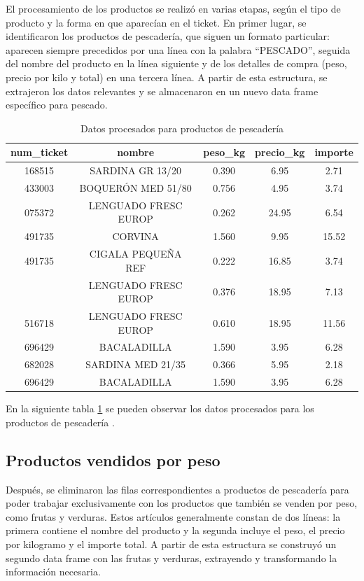 \documentclass[,article,submit,moreauthors,pdftex]{Definitions/mdpi}
\begin{document}
El procesamiento de los productos se realizó en varias etapas, según el
tipo de producto y la forma en que aparecían en el ticket. En primer
lugar, se identificaron los productos de pescadería, que siguen un
formato particular: aparecen siempre precedidos por una línea con la
palabra ``PESCADO'', seguida del nombre del producto en la línea
siguiente y de los detalles de compra (peso, precio por kilo y total) en
una tercera línea. A partir de esta estructura, se extrajeron los datos
relevantes y se almacenaron en un nuevo data frame específico para
pescado.

\begin{table}

\caption{\label{tab:tabla_pescado}Datos procesados para productos de pescadería}
\centering
\begin{tabular}[t]{ccccc}
\toprule
num\_ticket & nombre & peso\_kg & precio\_kg & importe\\
\midrule
168515 & SARDINA GR 13/20 & 0.390 & 6.95 & 2.71\\
433003 & BOQUERÓN MED 51/80 & 0.756 & 4.95 & 3.74\\
075372 & LENGUADO FRESC EUROP & 0.262 & 24.95 & 6.54\\
491735 & CORVINA & 1.560 & 9.95 & 15.52\\
491735 & CIGALA PEQUEÑA REF & 0.222 & 16.85 & 3.74\\
\addlinespace
087622 & LENGUADO FRESC EUROP & 0.376 & 18.95 & 7.13\\
516718 & LENGUADO FRESC EUROP & 0.610 & 18.95 & 11.56\\
696429 & BACALADILLA & 1.590 & 3.95 & 6.28\\
682028 & SARDINA MED 21/35 & 0.366 & 5.95 & 2.18\\
696429 & BACALADILLA & 1.590 & 3.95 & 6.28\\
\bottomrule
\end{tabular}
\end{table}

En la siguiente tabla \ref{tab:tabla_pescado} se pueden observar los
datos procesados para los productos de pescadería .

\hypertarget{productos-vendidos-por-peso}{%
\subsection{Productos vendidos por
peso}\label{productos-vendidos-por-peso}}

Después, se eliminaron las filas correspondientes a productos de
pescadería para poder trabajar exclusivamente con los productos que
también se venden por peso, como frutas y verduras. Estos artículos
generalmente constan de dos líneas: la primera contiene el nombre del
producto y la segunda incluye el peso, el precio por kilogramo y el
importe total. A partir de esta estructura se construyó un segundo data
frame con las frutas y verduras, extrayendo y transformando la
información necesaria.
\end{document}
